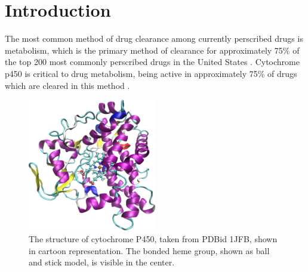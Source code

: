 \section{Introduction}
\label{section:p450/introduction}
The most common method of drug clearance among currently perscribed drugs is metabolism, which is the primary method of clearance for approximately 75\% of the top 200 most commonly perscribed drugs in the United States \cite{williams2004drug}.
Cytochrome p450 is critical to drug metabolism, being active in approximately 75\% of drugs which are cleared in this method \cite{guengerich2007cytochrome}.

\begin{figure}[h]
\centering
\includegraphics[width=0.5\textwidth]{figures/p450.png}
\caption{
The structure of cytochrome P450, taken from PDBid 1JFB, shown in cartoon representation.
The bonded heme group, shown as ball and stick model, is visible in the center.
}
\label{fig:p450}
\end{figure}

